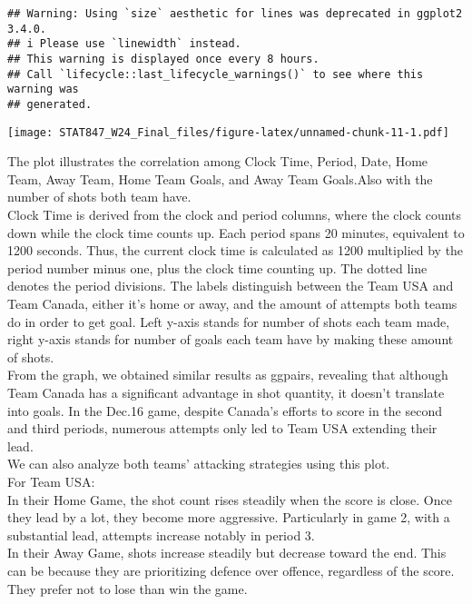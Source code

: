 \documentclass[
  a3paper,
]{article}
\begin{document}
\begin{verbatim}
## Warning: Using `size` aesthetic for lines was deprecated in ggplot2 3.4.0.
## i Please use `linewidth` instead.
## This warning is displayed once every 8 hours.
## Call `lifecycle::last_lifecycle_warnings()` to see where this warning was
## generated.
\end{verbatim}

\texttt{[image: STAT847\_W24\_Final\_files/figure-latex/unnamed-chunk-11-1.pdf]}

The plot illustrates the correlation among Clock Time, Period, Date,
Home Team, Away Team, Home Team Goals, and Away Team Goals.Also with the
number of shots both team have.\\

Clock Time is derived from the clock and period columns, where the clock
counts down while the clock time counts up. Each period spans 20
minutes, equivalent to 1200 seconds. Thus, the current clock time is
calculated as 1200 multiplied by the period number minus one, plus the
clock time counting up. The dotted line denotes the period divisions.
The labels distinguish between the Team USA and Team Canada, either it's
home or away, and the amount of attempts both teams do in order to get
goal. Left y-axis stands for number of shots each team made, right
y-axis stands for number of goals each team have by making these amount
of shots.\\

From the graph, we obtained similar results as ggpairs, revealing that
although Team Canada has a significant advantage in shot quantity, it
doesn't translate into goals. In the Dec.16 game, despite Canada's
efforts to score in the second and third periods, numerous attempts only
led to Team USA extending their lead.\\

We can also analyze both teams' attacking strategies using this plot.\\

For Team USA:\\
In their Home Game, the shot count rises steadily when the score is
close. Once they lead by a lot, they become more aggressive.
Particularly in game 2, with a substantial lead, attempts increase
notably in period 3.\\
In their Away Game, shots increase steadily but decrease toward the end.
This can be because they are prioritizing defence over offence,
regardless of the score. They prefer not to lose than win the game.\\
\end{document}
